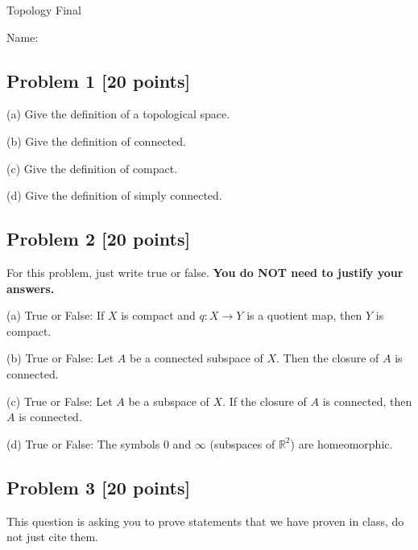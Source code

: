 \documentclass{article}
\newcommand{\bigjump}{\vspace{1.7 in}}
\begin{document}
\begin{center}
   {\huge Topology Final}
\end{center}

\vspace{0.3 in}

Name: \underline{\hspace{6cm}}

\vspace{0.2cm}

\subsection*{Problem 1 [20 points]}
(a) Give the definition of a topological space.

\bigjump

(b) Give the definition of connected.

\bigjump

(c) Give the definition of compact.

\bigjump

(d) Give the definition of simply connected.

\newpage

\subsection*{Problem 2 [20 points]}
For this problem, just write true or false. \textbf{You do NOT need to justify your answers.}

\vspace{0.5cm}

(a) True or False: If $X$ is compact and $q: X \rightarrow Y$ is a quotient map, then $Y$ is compact.

\bigjump

(b) True or False: Let $A$ be a connected subspace of $X$. Then the closure of $A$ is connected.

\bigjump

(c) True or False: Let $A$ be a subspace of $X$. If the closure of $A$ is connected, then $A$ is connected.

\bigjump

(d) True or False: The symbols 0 and $\infty$ (subspaces of $\mathbb{R}^2$) are homeomorphic.

\newpage


\subsection*{Problem 3 [20 points]} This question is asking you to prove statements that we have proven in class, do not just cite them.
\end{document}

